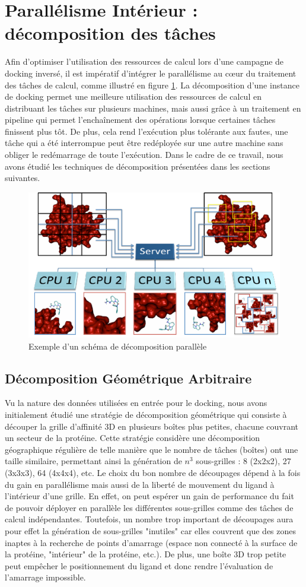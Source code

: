 \section{Parallélisme Intérieur : décomposition des tâches}
Afin d'optimiser l'utilisation des ressources de calcul lors d'une campagne de docking inversé, il est impératif d'intégrer le parallélisme au c{\oe}ur du traitement des tâches de calcul, comme illustré en figure \ref{fig:romain-fig1}. La décomposition d'une instance de docking permet une meilleure utilisation des ressources de calcul en distribuant les tâches sur plusieurs machines, mais aussi grâce à un traitement en pipeline qui permet l'enchaînement des opérations lorsque certaines tâches finissent plus tôt. De plus, cela rend l'exécution plus tolérante aux fautes, une tâche qui a été interrompue peut être redéployée sur une autre machine sans obliger le redémarrage de toute l'exécution. Dans le cadre de ce travail, nous avons étudié les techniques de décomposition présentées dans les sections suivantes. 

\begin{figure}
	\centering
		\includegraphics[width=0.5\linewidth]{images/Romain/fig1-color}
	\caption{Exemple d'un schéma de décomposition parallèle}\label{fig:romain-fig1}
\end{figure}

\subsection{Décomposition Géométrique Arbitraire}
Vu la nature des données utilisées en entrée pour le docking, nous avons initialement étudié une stratégie de décomposition géométrique qui consiste à découper la grille d'affinité 3D en plusieurs boîtes plus petites, chacune couvrant un secteur de la protéine. Cette stratégie considère une décomposition géographique régulière de telle manière que le nombre de tâches (boîtes) ont une taille similaire, permettant ainsi la génération de $n^3$ sous-grilles : 8 (2x2x2), 27 (3x3x3), 64 (4x4x4), etc. Le choix du bon nombre de découpages dépend à la fois du gain  en parallélisme mais aussi de la liberté de mouvement du ligand à l'intérieur d'une grille. 
En effet, on peut espérer un gain de performance du fait de pouvoir déployer en parallèle les différentes sous-grilles comme des tâches de calcul indépendantes. Toutefois, un nombre trop important de découpages aura pour effet la génération de sous-grilles "inutiles" car elles couvrent que des zones inaptes à la recherche de points d'amarrage (espace non connecté à la surface de la protéine, "intérieur" de la protéine, etc.). De plus, une boîte 3D trop petite peut empêcher le positionnement du ligand et donc rendre l'évaluation de l'amarrage impossible.

